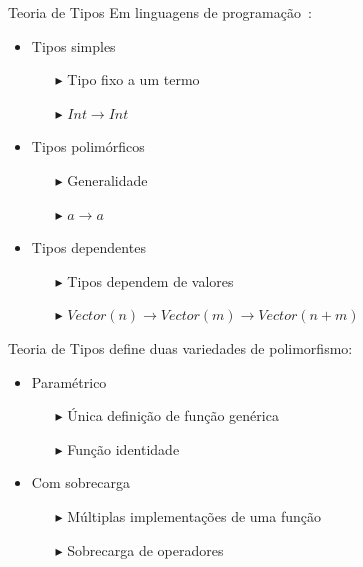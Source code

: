 \begin{frame}{Teoria de Tipos}
    Em linguagens de programação~\cite{PIERCE2002}:
    \begin{itemize}
        \item Tipos simples
              \begin{itemize}
                  \item[$\blacktriangleright$] Tipo fixo a um termo
                  \item[$\blacktriangleright$] $Int \rightarrow Int$
              \end{itemize}
        \item[]
        \item Tipos polimórficos
              \begin{itemize}
                  \item[$\blacktriangleright$] Generalidade
                  \item[$\blacktriangleright$] $a \rightarrow a$
              \end{itemize}
        \item[]
        \item Tipos dependentes
              \begin{itemize}
                  \item[$\blacktriangleright$] Tipos dependem de valores
                  \item[$\blacktriangleright$] $Vector(n) \rightarrow Vector(m) \rightarrow Vector(n+m)$
              \end{itemize}
    \end{itemize}
\end{frame}

\begin{frame}{Teoria de Tipos}
     define duas variedades de polimorfismo:
    \begin{itemize}
        \item Paramétrico
              \begin{itemize}
                  \item[$\blacktriangleright$] Única definição de função genérica
                  \item[$\blacktriangleright$] Função identidade
              \end{itemize}
        \item[]
        \item Com sobrecarga
              \begin{itemize}
                  \item[$\blacktriangleright$] Múltiplas implementações de uma função
                  \item[$\blacktriangleright$] Sobrecarga de operadores
              \end{itemize}
    \end{itemize}
\end{frame}

